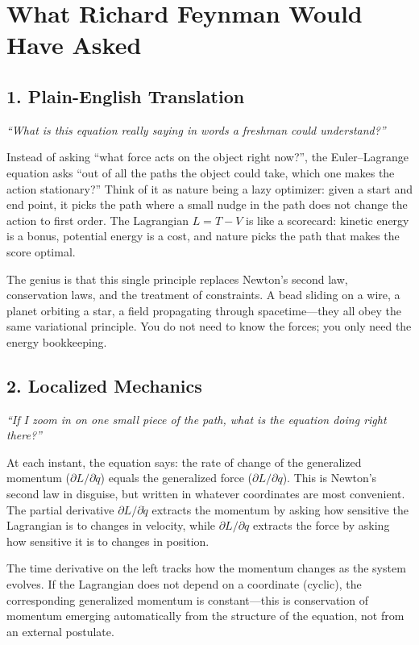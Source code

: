 \documentclass[11pt,openright]{book}
\begin{document}
\section*{What Richard Feynman Would Have Asked}

\subsection*{1. Plain-English Translation}
\textit{``What is this equation really saying in words a freshman could understand?''}

Instead of asking ``what force acts on the object right now?'', the Euler--Lagrange equation asks ``out of all the paths the object could take, which one makes the action stationary?'' Think of it as nature being a lazy optimizer: given a start and end point, it picks the path where a small nudge in the path does not change the action to first order. The Lagrangian $L = T - V$ is like a scorecard: kinetic energy is a bonus, potential energy is a cost, and nature picks the path that makes the score optimal.

The genius is that this single principle replaces Newton's second law, conservation laws, and the treatment of constraints. A bead sliding on a wire, a planet orbiting a star, a field propagating through spacetime---they all obey the same variational principle. You do not need to know the forces; you only need the energy bookkeeping.

\subsection*{2. Localized Mechanics}
\textit{``If I zoom in on one small piece of the path, what is the equation doing right there?''}

At each instant, the equation says: the rate of change of the generalized momentum ($\partial L / \partial \dot{q}$) equals the generalized force ($\partial L / \partial q$). This is Newton's second law in disguise, but written in whatever coordinates are most convenient. The partial derivative $\partial L / \partial \dot{q}$ extracts the momentum by asking how sensitive the Lagrangian is to changes in velocity, while $\partial L / \partial q$ extracts the force by asking how sensitive it is to changes in position.

The time derivative on the left tracks how the momentum changes as the system evolves. If the Lagrangian does not depend on a coordinate (cyclic), the corresponding generalized momentum is constant---this is conservation of momentum emerging automatically from the structure of the equation, not from an external postulate.
\end{document}
